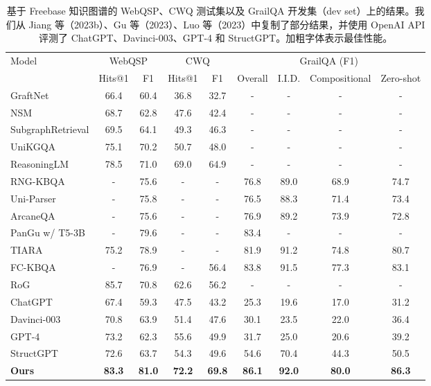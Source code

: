 \documentclass[11pt,UTF8,fontset=fandol]{ctexart}
\begin{document}
\begin{table}[H]\centering
\caption{基于 Freebase 知识图谱的 WebQSP、CWQ 测试集以及 GrailQA 开发集（dev set）上的结果。我们从 Jiang 等（2023b）、Gu 等（2023）、Luo 等（2023）中复制了部分结果，并使用 OpenAI API 评测了 ChatGPT、Davinci-003、GPT-4 和 StructGPT。加粗字体表示最佳性能。}
\label{tab:2}
\setlength{\tabcolsep}{4pt}
\begin{tabular}{lcccccccc}
\toprule
\multirow{2}{*}{Model} & \multicolumn{2}{c}{WebQSP} & \multicolumn{2}{c}{CWQ} & \multicolumn{4}{c}{GrailQA (F1)} \\
\cmidrule(lr){2-3}\cmidrule(lr){4-5}\cmidrule(lr){6-9}
 & Hits@1 & F1 & Hits@1 & F1 & Overall & I.I.D. & Compositional & Zero-shot \\
\midrule
GraftNet          & 66.4 & 60.4 & 36.8 & 32.7 & -    & -    & -    & -    \\
NSM               & 68.7 & 62.8 & 47.6 & 42.4 & -    & -    & -    & -    \\
SubgraphRetrieval & 69.5 & 64.1 & 49.3 & 46.3 & -    & -    & -    & -    \\
UniKGQA           & 75.1 & 70.2 & 50.7 & 48.0 & -    & -    & -    & -    \\
ReasoningLM       & 78.5 & 71.0 & 69.0 & 64.9 & -    & -    & -    & -    \\
RNG-KBQA          & -    & 75.6 & -    & -    & 76.8 & 89.0 & 68.9 & 74.7 \\
Uni-Parser        & -    & 75.8 & -    & -    & 76.5 & 88.3 & 71.4 & 73.4 \\
ArcaneQA          & -    & 75.6 & -    & -    & 76.9 & 89.2 & 73.9 & 72.8 \\
PanGu w/ T5-3B    & -    & 79.6 & -    & -    & 83.4 & -    & -    & -    \\
TIARA             & 75.2 & 78.9 & -    & -    & 81.9 & 91.2 & 74.8 & 80.7 \\
FC-KBQA           & -    & 76.9 & -    & 56.4 & 83.8 & 91.5 & 77.3 & 83.1 \\
RoG               & 85.7 & 70.8 & 62.6 & 56.2 & -    & -    & -    & -    \\
ChatGPT           & 67.4 & 59.3 & 47.5 & 43.2 & 25.3 & 19.6 & 17.0 & 31.2 \\
Davinci-003       & 70.8 & 63.9 & 51.4 & 47.6 & 30.1 & 23.5 & 22.0 & 36.4 \\
GPT-4             & 73.2 & 62.3 & 55.6 & 49.9 & 31.7 & 25.0 & 20.6 & 39.2 \\
StructGPT         & 72.6 & 63.7 & 54.3 & 49.6 & 54.6 & 70.4 & 44.3 & 50.5 \\
\textbf{Ours}     & \textbf{83.3} & \textbf{81.0} & \textbf{72.2} & \textbf{69.8} & \textbf{86.1} & \textbf{92.0} & \textbf{80.0} & \textbf{86.3} \\
\bottomrule
\end{tabular}
\end{table}
\end{document}
